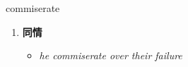 
\begin{frame}
{\huge commiserate}
\begin{center}
\begin{enumerate}\Large
  \item \textbf{同情}
  \begin{itemize}
    \item \em{\Large{he commiserate over their failure}}
  \end{itemize}
\end{enumerate}
\end{center}
\end{frame}
